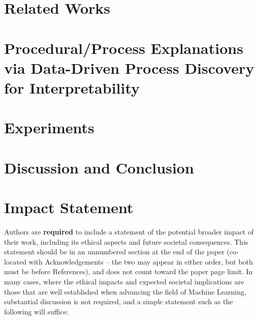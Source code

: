 \documentclass{article}
\theoremstyle{plain}
\theoremstyle{definition}
\theoremstyle{remark}
\begin{document}
\section*{Related Works}









\section*{Procedural/Process Explanations via Data-Driven Process Discovery for Interpretability}



\section*{Experiments}


\section*{Discussion and Conclusion}




\section*{Impact Statement}

Authors are \textbf{required} to include a statement of the potential broader
impact of their work, including its ethical aspects and future societal
consequences. This statement should be in an unnumbered section at the end of
the paper (co-located with Acknowledgements -- the two may appear in either
order, but both must be before References), and does not count toward the paper
page limit. In many cases, where the ethical impacts and expected societal
implications are those that are well established when advancing the field of
Machine Learning, substantial discussion is not required, and a simple
statement such as the following will suffice:
\end{document}
